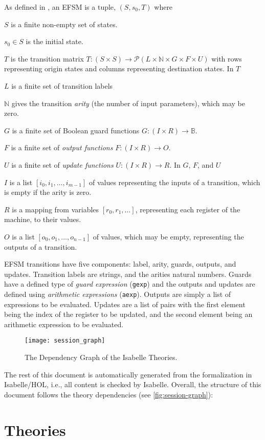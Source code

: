 \documentclass[10pt,DIV16,a4paper,abstract=true,twoside=semi,openright]{scrreprt}
\newcommand\mydescriptionlabel[1]{\hspace{\leftmargini}\textbf{#1}}
\newenvironment{where}{%
  \let\descriptionlabel\mydescriptionlabel
  \description[itemsep=0em, font=\normalfont]
}{%
  \enddescription
}
\begin{document}
As defined in \cite{foster2018}, an EFSM is a tuple, $(S, s_0, T)$ where
\begin{where}
  \item [$S$] is a finite non-empty set of states.
  \item [$s_0 \in S$]is the initial state.
  \item [$T$] is the transition matrix $T:(S \times S) \to \mathcal{P}(L \times \mathbb{N} \times G \times F \times U)$ with rows representing origin states and columns representing destination states.
\end{where}
In $T$
\begin{where}
  \item [$L$] is a finite set of transition labels
  \item [$\mathbb{N}$] gives the transition \emph{arity} (the number of input parameters), which may be zero.
  \item [$G$] is a finite set of Boolean guard functions $G:(I \times R) \to \mathbb{B}$.
  \item [$F$] is a finite set of \emph{output functions} $F:(I \times R) \to O$.
  \item [$U$] is a finite set of \emph{update functions} $U:(I \times R) \to R$.
\end{where}
In $G$, $F$, and $U$
\begin{where}
  \item [$I$] is a list $[i_0, i_1, \ldots, i_{m-1}]$ of values representing the inputs of a transition, which is empty if the arity is zero.
  \item [$R$] is a mapping from variables $[r_0, r_1, \ldots]$, representing each register of the machine, to their values.
  \item [$O$] is a list $[o_0, o_1, \ldots, o_{n-1}]$ of values, which may be empty, representing the outputs of a transition.
\end{where}

EFSM transitions have five components: label, arity, guards, outputs, and updates. Transition labels are strings, and the arities natural numbers. Guards have a defined type of \emph{guard expression} (\texttt{gexp}) and the outputs and updates are defined using \emph{arithmetic expressions} (\texttt{aexp}). Outputs are simply a list of expressions to be evaluated. Updates are a list of pairs with the first element being the index of the register to be updated, and the second element being an arithmetic expression to be evaluated.

\begin{figure}
  \centering
  \texttt{[image: session\_graph]}
  \caption{The Dependency Graph of the Isabelle Theories.\label{fig:session-graph}}
\end{figure}
The rest of this document is automatically generated from the
formalization in Isabelle/HOL, i.e., all content is checked by
Isabelle.  Overall, the structure of this document follows the
theory dependencies (see \autoref{fig:session-graph}):

\nocite{foster.ea:efsm:2018}

\clearpage
\chapter{Theories}




{\small
  
  
}
\end{document}
